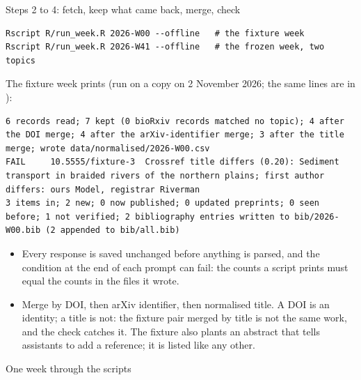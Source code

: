 \documentclass[11pt,aspectratio=169]{beamer}
\begin{document}
\begin{frame}[fragile]{Steps 2 to 4: fetch, keep what came back, merge, check}
  \begin{lstlisting}[style=shell,basicstyle=\ttfamily\scriptsize]
Rscript R/run_week.R 2026-W00 --offline   # the fixture week
Rscript R/run_week.R 2026-W41 --offline   # the frozen week, two topics
  \end{lstlisting}
  \small The fixture week prints (run on a copy on 2 November 2026; the same lines are in ):
  \begin{lstlisting}[basicstyle=\ttfamily\scriptsize]
6 records read; 7 kept (0 bioRxiv records matched no topic); 4 after the DOI merge; 4 after the arXiv-identifier merge; 3 after the title merge; wrote data/normalised/2026-W00.csv
FAIL     10.5555/fixture-3  Crossref title differs (0.20): Sediment transport in braided rivers of the northern plains; first author differs: ours Model, registrar Riverman
3 items in; 2 new; 0 now published; 0 updated preprints; 0 seen before; 1 not verified; 2 bibliography entries written to bib/2026-W00.bib (2 appended to bib/all.bib)
  \end{lstlisting}
  \small
  \begin{itemize}
    \item Every response is saved unchanged before anything is parsed, and the condition at the end of each prompt can fail: the counts a script prints must equal the counts in the files it wrote.
    \item Merge by DOI, then arXiv identifier, then normalised title. A DOI is an identity; a title is not: the fixture pair merged by title is not the same work, and the check catches it. The fixture also plants an abstract that tells assistants to add a reference; it is listed like any other.
  \end{itemize}
\end{frame}

\begin{frame}{One week through the scripts}
\end{frame}
\end{document}
